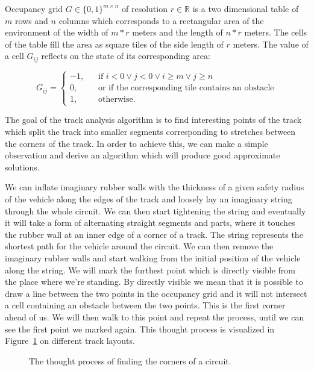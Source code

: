 \begin{defn}\label{def:occupancy_grid}
	Occupancy grid $G\in\{0, 1\}^{m\times n}$ of resolution $r\in\mathbb{R}$ is a two dimensional table of $m$ rows and $n$ columns which corresponds to a rectangular area of the environment of the width of $m * r$ meters and the length of $n * r$ meters. The cells of the table fill the area as square tiles of the side length of $r$ meters. The value of a cell $G_{ij}$ reflects on the state of its corresponding area:
	
	\[
	G_{ij} =
	\begin{cases}
	-1\text{,} &\quad\text{if } i < 0 \vee j < 0 \vee i \geq m \vee j \geq n\\
	0\text{,} &\quad\text{or if the corresponding tile contains an obstacle} \\
	1\text{,} &\quad\text{otherwise.}
	\end{cases}
	\]
\end{defn}

The goal of the track analysis algorithm is to find interesting points of the track which split the track into smaller segments corresponding to stretches between the corners of the track. In order to achieve this, we can make a simple observation and derive an algorithm which will produce good approximate solutions.

We can inflate imaginary rubber walls with the thickness of a given safety radius of the vehicle along the edges of the track and loosely lay an imaginary string through the whole circuit. We can then start tightening the string and eventually it will take a form of alternating straight segments and parts, where it touches the rubber wall at an inner edge of a corner of a track. The string represents the shortest path for the vehicle around the circuit. We can then remove the imaginary rubber walls and start walking from the initial position of the vehicle along the string. We will mark the furthest point which is directly visible from the place where we're standing. By directly visible we mean that it is possible to draw a line between the two points in the occupancy grid and it will not intersect a cell containing an obstacle between the two points. This is the first corner ahead of us. We will then walk to this point and repeat the process, until we can see the first point we marked again. This thought process is visualized in Figure~\ref{fig:thought_process} on different track layouts.

\begin{figure}
	\caption{The thought process of finding the corners of a circuit.}
	\label{fig:thought_process}
\end{figure}

